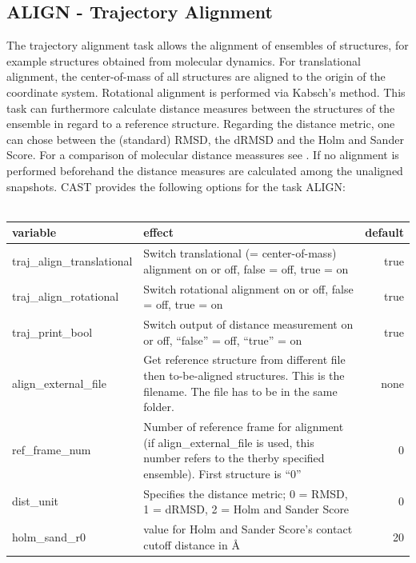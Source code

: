 \documentclass[10pt,a4paper]{article} %
\begin{document}
	
	\subsection{ALIGN - Trajectory Alignment}
	\label{sec:align}
	The trajectory alignment task allows the alignment of ensembles of structures, for example structures obtained from molecular dynamics. For translational alignment, the center-of-mass of all structures are aligned to the origin of the coordinate system. Rotational alignment is performed via Kabsch's method\supercite{kabsch1, kabsch2}. This task can furthermore calculate distance measures between the structures of the ensemble in regard to a reference structure. Regarding the distance metric, one can chose between the (standard) \ac{RMSD}, the \ac{dRMSD} and the Holm and Sander Score\supercite{holmsander}. For a comparison of molecular distance meassures see \cite{distancemeasures}. If no alignment is performed beforehand the distance measures are calculated among the unaligned snapshots. \ac{CAST} provides the following options for the task ALIGN: \\~\\
	
	\begin{tabularx}{\textwidth}{l|X|r}
		variable & effect & default\\
		\hline
		traj\_align\_translational & Switch translational (= center-of-mass) alignment on or off, false = off, true = on & true\\
		traj\_align\_rotational & Switch rotational alignment\cite{kabsch1, kabsch2} on or off, false = off, true = on & true\\
		traj\_print\_bool & Switch output of distance measurement on or off, ``false'' = off, ``true'' = on & true\\
		align\_external\_file & Get reference structure from different file then to-be-aligned structures. This is the filename. The file has to be in the same folder. & none\\
		ref\_frame\_num & Number of reference frame for alignment (if align\_external\_file is used, this number refers to the therby specified ensemble). First structure is ``0'' & 0\\
		dist\_unit & Specifies the distance metric; 0 = RMSD, 1 = dRMSD, 2 = Holm and Sander Score & 0\\
		holm\_sand\_r0 & value for Holm and Sander Score's contact cutoff distance in \AA & 20 \\
		
	\end{tabularx}
	
\end{document}
